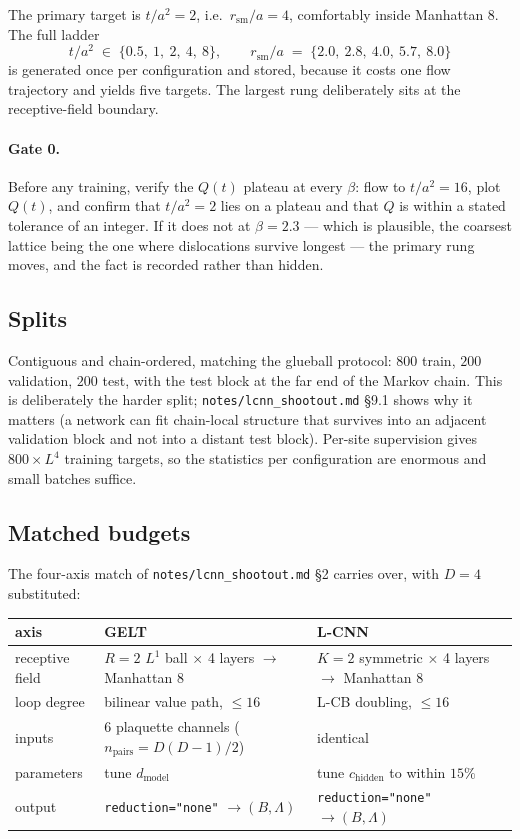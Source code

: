 \documentclass[11pt,a4paper]{article}
\begin{document}
The primary target is $t/a^2 = 2$, i.e.\ $r_{\mathrm{sm}}/a = 4$, comfortably
inside Manhattan $8$. The full ladder
\begin{equation}
  t/a^2 \;\in\; \{0.5,\ 1,\ 2,\ 4,\ 8\},
  \qquad r_{\mathrm{sm}}/a \;=\; \{2.0,\ 2.8,\ 4.0,\ 5.7,\ 8.0\}
\end{equation}
is generated once per configuration and stored, because it costs one flow
trajectory and yields five targets. The largest rung deliberately sits at the
receptive-field boundary.

\paragraph{Gate 0.} Before any training, verify the $Q(t)$ plateau at every
$\beta$: flow to $t/a^2 = 16$, plot $Q(t)$, and confirm that $t/a^2 = 2$ lies on
a plateau and that $Q$ is within a stated tolerance of an integer. If it does
not at $\beta = 2.3$ --- which is plausible, the coarsest lattice being the one
where dislocations survive longest --- the primary rung moves, and the fact is
recorded rather than hidden.

\subsection{Splits}

Contiguous and chain-ordered, matching the glueball protocol: $800$ train,
$200$ validation, $200$ test, with the test block at the far end of the Markov
chain. This is deliberately the harder split; \texttt{notes/lcnn\_shootout.md}
\S9.1 shows why it matters (a network can fit chain-local structure that survives
into an adjacent validation block and not into a distant test block). Per-site
supervision gives $800 \times L^4$ training targets, so the statistics per
configuration are enormous and small batches suffice.

\subsection{Matched budgets}

The four-axis match of \texttt{notes/lcnn\_shootout.md} \S2 carries over, with
$D = 4$ substituted:

\begin{center}
\begin{tabular}{lll}
\toprule
axis & GELT & L-CNN \\
\midrule
receptive field & $R = 2$ $L^1$ ball $\times$ 4 layers $\to$ Manhattan 8 & $K = 2$ symmetric $\times$ 4 layers $\to$ Manhattan 8 \\
loop degree & bilinear value path, $\le 16$ & L-CB doubling, $\le 16$ \\
inputs & $6$ plaquette channels ($n_{\mathrm{pairs}} = D(D{-}1)/2$) & identical \\
parameters & tune $d_{\mathrm{model}}$ & tune $c_{\mathrm{hidden}}$ to within $15\%$ \\
output & \texttt{reduction="none"} $\to (B, \Lambda)$ & \texttt{reduction="none"} $\to (B,\Lambda)$ \\
\bottomrule
\end{tabular}
\end{center}
\end{document}
